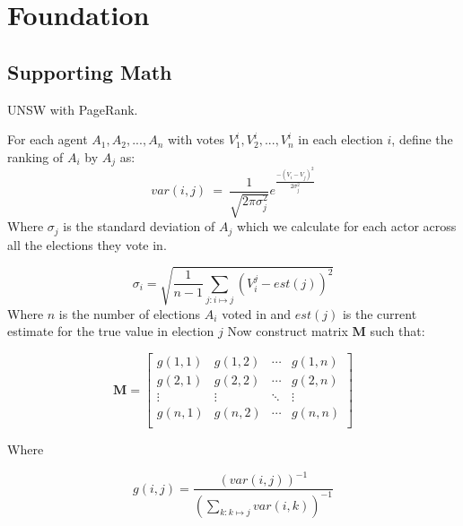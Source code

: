 
\chapter{Foundation} %

\label{ideas} %


\section{Supporting Math}

UNSW with PageRank.

For each agent $A_1, A_2, ..., A_n$ with votes $V^i_1, V^i_2, ..., V^i_n$ in each election $i$, define the ranking of $A_i$ by $A_j$ as:
\begin{equation}
    \textit{var}(i, j)\ =\ \frac{1}{\sqrt{2\pi\sigma_j^2}}e^{\frac{-(V_i - V_j)^2}{2\sigma_j^2}}
\end{equation}
Where $\sigma_j$ is the standard deviation of $A_j$ which we calculate for each actor across all the elections they vote in. 

\begin{equation}
    \sigma_i = \sqrt{\frac{1}{n-1} \sum\limits_{j:i\mapsto j} (V_i^j - est(j))^2}
\end{equation}
Where $n$ is the number of elections $A_i$ voted in and $est(j)$ is the current estimate for the true value in election $j$
Now construct matrix $\mathbf{M}$ such that:

\begin{equation}
    \mathbf{M} = 
    \begin{bmatrix}
    g(1, 1) & g(1, 2) & \dotsm & g(1, n) \\
    g(2, 1) & g(2, 2) & \dotsm & g(2, n) \\
    \vdots & \vdots & \ddots & \vdots \\
    g(n, 1) & g(n, 2) & \dotsm & g(n, n) \\
    \end{bmatrix}
\end{equation}

Where 

\begin{equation}
    g(i, j) = \frac{(var(i, j))^{-1}}{\left(\sum\limits_{k:k\mapsto j} var(i, k)\right)^{-1}}
\end{equation}

